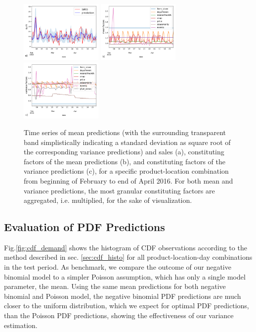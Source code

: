 \documentclass[BCOR=1mm, DIV=calc,10pt,
twoside=true,
twocolumn,
headings=normal]{scrartcl}
\newcommand{\fig}{Fig.}
\begin{document}
\begin{figure}
\begin{center}
\includegraphics[width=4cm]{../figures/ts_item_16_store_6}
\includegraphics[width=4cm]{../figures/factors_ts}
\includegraphics[width=4cm]{../figures/factors_ts_width}
\caption{\label{fig:factor_plots} Time series of mean predictions (with the surrounding transparent band simplistically indicating a standard deviation as square root of the corresponding variance predictions) and sales (a), constituting factors of the mean predictions (b), and constituting factors of the variance predictions (c), for a specific product-location combination from beginning of February to end of April 2016. For both mean and variance predictions, the most granular constituting factors are aggregated, i.e. multiplied, for the sake of visualization.}
\end{center}
\end{figure}

\subsection{Evaluation of PDF Predictions}

\fig \ref{fig:cdf_demand} shows the histogram of CDF observations according to the method described in sec. \ref{sec:cdf_histo} for all product-location-day combinations in the test period. As benchmark, we compare the outcome of our negative binomial model to a simpler Poisson assumption, which has only a single model parameter, the mean. Using the same mean predictions for both negative binomial and Poisson model, the negative binomial PDF predictions are much closer to the uniform distribution, which we expect for optimal PDF predictions, than the Poisson PDF predictions, showing the effectiveness of our variance estimation.
\end{document}
